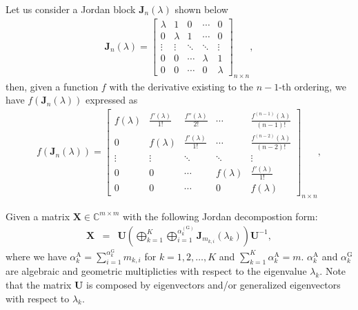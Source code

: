 \documentclass[11pt]{article}
\begin{document}
Let us consider a Jordan block $\bm{J}_{n}(\lambda)$ shown below
%
\begin{eqnarray}\label{eq: Jordan Block}
\bm{J}_{n}(\lambda)= \begin{bmatrix}
   \lambda & 1 & 0 & \cdots & 0 \\
   0 & \lambda & 1 & \cdots & 0 \\
   \vdots & \vdots & \ddots & \ddots & \vdots \\
   0 & 0 & \cdots & \lambda & 1 \\
   0 & 0 & \cdots & 0 & \lambda
   \end{bmatrix}_{n\times n},
\end{eqnarray}
%
then, given a function $f$ with the derivative existing to the $n-1$-th ordering, we have $f(\bm{J}_{n}(\lambda))$ expressed as
%
\begin{eqnarray}\label{eq: f Jordan Block}
f(\bm{J}_{n}(\lambda))= \begin{bmatrix}
   f(\lambda) & \frac{f'(\lambda)}{1!} & \frac{f''(\lambda)}{2!} & \cdots & \frac{f^{(n-1)}(\lambda)}{(n-1)!} \\
   0 & f(\lambda) & \frac{f'(\lambda)}{1!} & \cdots & \frac{f^{(n-2)}(\lambda)}{(n-2)!}  \\
   \vdots & \vdots & \ddots & \ddots & \vdots \\
   0 & 0 & \cdots & f(\lambda) & \frac{f'(\lambda)}{1!} \\
   0 & 0 & \cdots & 0 & f(\lambda)
   \end{bmatrix}_{n\times n},
\end{eqnarray}

Given a matrix $\bm{X}\in \mathbb{C}^{m \times m}$ with the following Jordan decompostion form:
%
\begin{eqnarray}\label{eq1: matrix setup GDO for Nilpotent}
\bm{X}&=& \bm{U}\left(\bigoplus\limits_{k=1}^{K}\bigoplus\limits_{i=1}^{\alpha_{k}^{(\mathrm{G})}}\bm{J}_{m_{k,i}}(\lambda_{k})\right)\bm{U}^{-1},
\end{eqnarray}
%
where we have $\alpha_k^{\mathrm{A}} = \sum\limits_{i=1}^{\alpha_k^{\mathrm{G}}} m_{k,i}$ for $k=1,2,\ldots,K$ and $\sum\limits_{k=1}^{K}\alpha_k^{\mathrm{A}}= m$. $\alpha_k^{\mathrm{A}}$ and $\alpha_k^{\mathrm{G}}$ are algebraic and geometric multiplicties with respect to the eigenvalue $\lambda_k$. Note that the matrix $\bm{U}$ is composed by eigenvectors and/or generalized eigenvectors with respect to $\lambda_k$.
\end{document}
